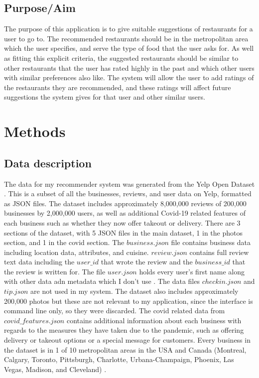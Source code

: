 \documentclass[conference]{IEEEtran}
\begin{document}
\subsection{Purpose/Aim}
The purpose of this application is to give suitable suggestions of restaurants for a user to go to. 
The recommended restaurants should be in the metropolitan area which the user specifies, and serve the 
type of food that the user asks for. 
As well as fitting this explicit criteria, the suggested restaurants should be similar to other restaurants 
that the user has rated highly in the past and which other users with similar preferences also like. 
The system will allow the user to add ratings of the restaurants they are recommended, and these ratings will 
affect future suggestions the system gives for that user and other similar users. 


\section{Methods}

\subsection{Data description}
The data for my recommender system was generated from the Yelp Open Dataset \cite{YelpDataset}. 
This is a subset of all the businesses, reviews, and user data on Yelp, formatted as JSON files. 
The dataset includes approximately 8,000,000 reviews of 200,000 businesses by 2,000,000 users, as well as 
additional Covid-19 related features of each business such as whether they now offer takeout or delivery. 
There are 3 sections of the dataset, with 5 JSON files in the main dataset, 1 in the photos section, and 
1 in the covid section. 
The $business.json$ file contains business data including location data, attributes, and cuisine. 
$review.json$ contains full review text data including the $user\_id$ that wrote the review and the $business\_id$ 
that the review is written for. 
The file $user.json$ holds every user's first name along with other data adn metadata which I don't use \cite{YelpDataset}. 
The data files $checkin.json$ and $tip.json$ are not used in my system. 
The dataset also includes approximately 200,000 photos but these are not relevant to my application, since 
the interface is command line only, so they were discarded. 
The covid related data from $covid\_features.json$ contains additional information about each business with regards to 
the measures they have taken due to the pandemic, such as offering delivery or takeout options or a 
special message for customers. 
Every business in the dataset is in 1 of 10 metropolitan areas in the USA and Canada 
(Montreal, Calgary, Toronto, Pittsburgh, Charlotte, Urbana-Champaign, Phoenix, Las Vegas, Madison, and Cleveland) \cite{YelpDataset}. 
\end{document}
